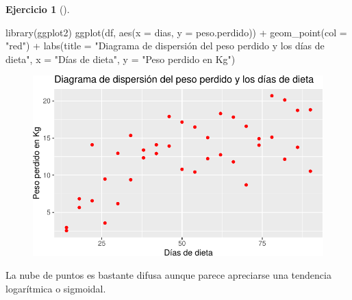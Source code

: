 \documentclass[
  a4paper,
]{scrreport}
\newenvironment{Shaded}{\begin{snugshade}}{\end{snugshade}}
\newcommand{\AttributeTok}[1]{\textcolor[rgb]{0.40,0.45,0.13}{#1}}
\newcommand{\FunctionTok}[1]{\textcolor[rgb]{0.28,0.35,0.67}{#1}}
\newcommand{\NormalTok}[1]{\textcolor[rgb]{0.00,0.23,0.31}{#1}}
\newcommand{\SpecialCharTok}[1]{\textcolor[rgb]{0.37,0.37,0.37}{#1}}
\newcommand{\StringTok}[1]{\textcolor[rgb]{0.13,0.47,0.30}{#1}}
\theoremstyle{definition}
\newtheorem{exercise}{Ejercicio}[chapter]
\theoremstyle{remark}
\begin{document}
\begin{exercise}[]
\begin{enumerate}
  \begin{tcolorbox}[enhanced jigsaw, coltitle=black, left=2mm, colback=white, leftrule=.75mm, toptitle=1mm, breakable, bottomrule=.15mm, titlerule=0mm, bottomtitle=1mm, title=\textcolor{quarto-callout-tip-color}{\faLightbulb}\hspace{0.5em}{Solución}, arc=.35mm, toprule=.15mm, rightrule=.15mm, colframe=quarto-callout-tip-color-frame, opacityback=0, colbacktitle=quarto-callout-tip-color!10!white, opacitybacktitle=0.6]

\begin{Shaded}
\begin{Highlighting}[]
\FunctionTok{library}\NormalTok{(ggplot2)}
\FunctionTok{ggplot}\NormalTok{(df, }\FunctionTok{aes}\NormalTok{(}\AttributeTok{x =}\NormalTok{ dias, }\AttributeTok{y =}\NormalTok{ peso.perdido)) }\SpecialCharTok{+}
    \FunctionTok{geom\_point}\NormalTok{(}\AttributeTok{col =} \StringTok{"red"}\NormalTok{) }\SpecialCharTok{+}
    \FunctionTok{labs}\NormalTok{(}\AttributeTok{title =} \StringTok{"Diagrama de dispersión del peso perdido y los días de dieta"}\NormalTok{, }\AttributeTok{x =} \StringTok{"Días de dieta"}\NormalTok{, }\AttributeTok{y =} \StringTok{"Peso perdido en Kg"}\NormalTok{)}
\end{Highlighting}
\end{Shaded}

  \begin{figure}[H]

  {\centering \includegraphics{05-regresion_files/figure-pdf/unnamed-chunk-35-1.pdf}

  }

  \end{figure}

  La nube de puntos es bastante difusa aunque parece apreciarse una
  tendencia logarítmica o sigmoidal.


\end{tcolorbox}
\end{enumerate}
\end{exercise}
\end{document}
